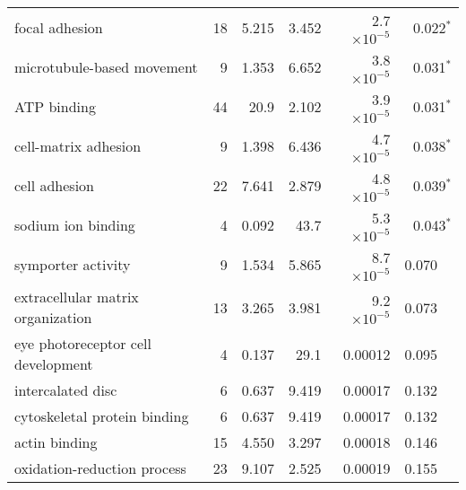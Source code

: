 \begin{longtable}{|l|r|r|r|r|r|}
                                    focal adhesion &                      18 &                   5.215 &      3.452 &  2.7$\times 10^{-5}$ &                 0.022$\bm{^*}$ \\
                        microtubule-based movement &                       9 &                   1.353 &      6.652 &  3.8$\times 10^{-5}$ &                 0.031$\bm{^*}$ \\
                                       ATP binding &                      44 &                    20.9 &      2.102 &  3.9$\times 10^{-5}$ &                 0.031$\bm{^*}$ \\
                              cell-matrix adhesion &                       9 &                   1.398 &      6.436 &  4.7$\times 10^{-5}$ &                 0.038$\bm{^*}$ \\
                                     cell adhesion &                      22 &                   7.641 &      2.879 &  4.8$\times 10^{-5}$ &                 0.039$\bm{^*}$ \\
                                sodium ion binding &                       4 &                   0.092 &       43.7 &  5.3$\times 10^{-5}$ &                 0.043$\bm{^*}$ \\
                                symporter activity &                       9 &                   1.534 &      5.865 &  8.7$\times 10^{-5}$ &                        0.070~~ \\
                 extracellular matrix organization &                      13 &                   3.265 &      3.981 &  9.2$\times 10^{-5}$ &                        0.073~~ \\
                eye photoreceptor cell development &                       4 &                   0.137 &       29.1 &              0.00012 &                        0.095~~ \\
                                 intercalated disc &                       6 &                   0.637 &      9.419 &              0.00017 &                        0.132~~ \\
                      cytoskeletal protein binding &                       6 &                   0.637 &      9.419 &              0.00017 &                        0.132~~ \\
                                     actin binding &                      15 &                   4.550 &      3.297 &              0.00018 &                        0.146~~ \\
                       oxidation-reduction process &                      23 &                   9.107 &      2.525 &              0.00019 &                        0.155~~ \\

\end{longtable}

